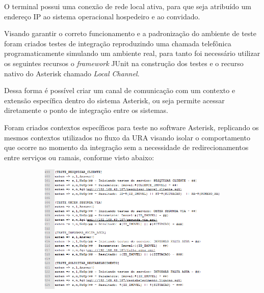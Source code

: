 O terminal possui uma conexão de rede local ativa, para que seja atribuído um endereço IP ao sistema operacional hospedeiro e ao convidado.

Visando garantir o correto funcionamento e a padronização do ambiente de teste foram criados testes de integração reproduzindo uma chamada telefônica programaticamente simulando um ambiente real, para tanto foi necessário utilizar os seguintes recursos o \textit{framework} JUnit na construção dos testes e o recurso nativo do Asterisk chamado \textit{Local Channel}.

Dessa forma é possível criar um canal de comunicação com um contexto e extensão específica dentro do sistema Asterisk, ou seja permite acessar diretamente o ponto de integração entre os sistemas.

Foram criados contextos específicos para teste no software Asterisk, replicando os mesmos contextos utilizados no fluxo da URA visando 
isolar o comportamento que ocorre no momento da integração sem a necessidade de redirecionamentos entre serviços ou ramais, conforme visto abaixo:

\begin{figure}[H]
	\centering
	\caption{Declaração dos contextos de teste no Asterisk}
	\label{figura:contextoTeste}
	\begin{subfigure}[H]{\textwidth}
		\centering
		\includegraphics{figuras/contexto_teste.png}
	\end{subfigure}
\end{figure}
	

